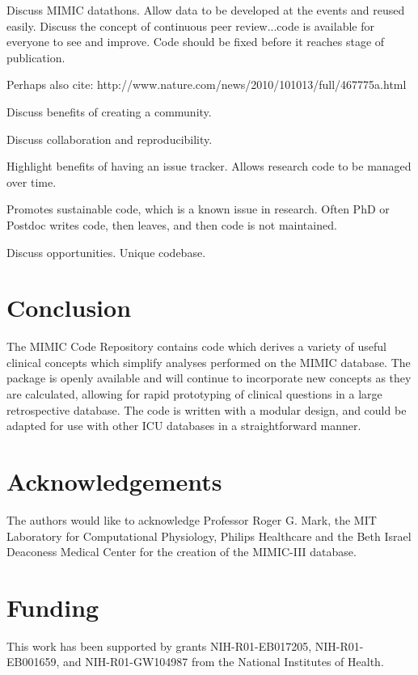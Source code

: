 \documentclass{bioinfo}
\begin{document}
Discuss MIMIC datathons. Allow data to be developed at the events and reused easily. Discuss the concept of continuous peer review...code is available for everyone to see and improve. Code should be fixed before it reaches stage of publication.

Perhaps also cite: http://www.nature.com/news/2010/101013/full/467775a.html

Discuss benefits of creating a community.

Discuss collaboration and reproducibility.

Highlight benefits of having an issue tracker. Allows research code to be managed over time. 

Promotes sustainable code, which is a known issue in research. Often PhD or Postdoc writes code, then leaves, and then code is not maintained.

Discuss opportunities. Unique codebase. 

\section{Conclusion}

The MIMIC Code Repository contains code which derives a variety of useful clinical concepts which simplify analyses performed on the MIMIC database. The package is openly available and will continue to incorporate new concepts as they are calculated, allowing for rapid prototyping of clinical questions in a large retrospective database. The code is written with a modular design, and could be adapted for use with other ICU databases in a straightforward manner.  \\

\section*{Acknowledgements}

The authors would like to acknowledge Professor Roger G. Mark, the MIT Laboratory for Computational Physiology, Philips Healthcare and the Beth Israel Deaconess Medical Center for the creation of the MIMIC-III database.%

\section*{Funding}

This work has been supported by grants NIH-R01-EB017205, NIH-R01-EB001659, and NIH-R01-GW104987 from the National Institutes of Health.%
\end{document}
